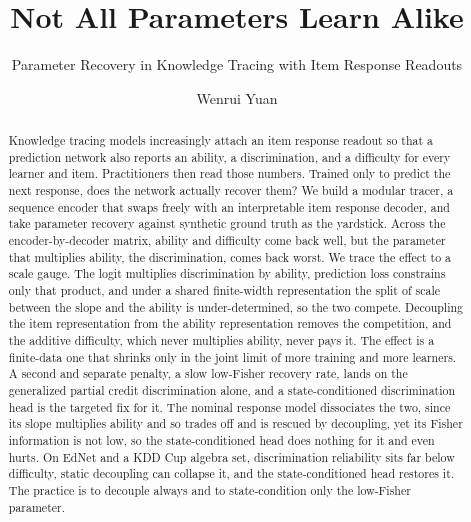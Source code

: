 \documentclass[sigconf,nonacm,screen]{acmart}
\begin{document}
\title{Not All Parameters Learn Alike}
\subtitle{Parameter Recovery in Knowledge Tracing with Item Response Readouts}

\author{Wenrui Yuan}
\email{}

\renewcommand{\shortauthors}{Yuan}

\begin{abstract}
Knowledge tracing models increasingly attach an item response readout so that a
prediction network also reports an ability, a discrimination, and a difficulty
for every learner and item. Practitioners then read those numbers. Trained only
to predict the next response, does the network actually recover them? We build a
modular tracer, a sequence encoder that swaps freely with an interpretable item
response decoder, and take parameter recovery against synthetic ground truth as
the yardstick. Across the encoder-by-decoder matrix, ability and difficulty come
back well, but the parameter that multiplies ability, the discrimination, comes
back worst. We trace the effect to a scale gauge. The logit multiplies
discrimination by ability, prediction loss constrains only that product, and
under a shared finite-width representation the split of scale between the slope
and the ability is under-determined, so the two compete. Decoupling the item
representation from the ability representation removes the competition, and the
additive difficulty, which never multiplies ability, never pays it. The effect is
a finite-data one that shrinks only in the joint limit of more training and more
learners. A second and separate penalty, a slow low-Fisher recovery rate, lands
on the generalized partial credit discrimination alone, and a state-conditioned
discrimination head is the targeted fix for it. The nominal response model
dissociates the two, since its slope multiplies ability and so trades off and is
rescued by decoupling, yet its Fisher information is not low, so the
state-conditioned head does nothing for it and even hurts. On EdNet and a KDD Cup
algebra set, discrimination reliability sits far below difficulty, static
decoupling can collapse it, and the state-conditioned head restores it. The
practice is to decouple always and to state-condition only the low-Fisher
parameter.
\end{abstract}

\end{document}
